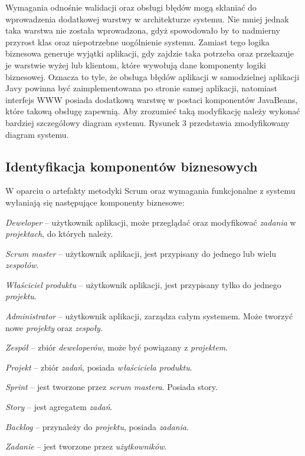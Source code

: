 Wymagania odnośnie walidacji oraz obsługi błędów mogą skłaniać do wprowadzenia dodatkowej warstwy w architekturze systemu. Nie mniej jednak taka warstwa nie została wprowadzona, gdyż spowodowało by to nadmierny przyrost klas oraz niepotrzebne uogólnienie systemu. Zamiast tego logika biznesowa generuje wyjątki aplikacji, gdy zajdzie taka potrzeba oraz przekazuje je warstwie wyżej lub klientom, które wywołują dane komponenty logiki biznesowej. Oznacza to tyle, że obsługa błędów aplikacji w samodzielnej aplikacji Javy powinna być zaimplementowana po stronie samej aplikacji, natomiast interfejs WWW posiada dodatkową warstwę w postaci komponentów JavaBeans, które takową obsługę zapewnią. Aby zrozumieć taką modyfikację należy wykonać bardziej szczegółowy diagram systemu. Rysunek 3 przedstawia zmodyfikowany diagram systemu.

\subsection{Identyfikacja komponentów biznesowych}
W oparciu o artefakty metodyki Scrum oraz wymagania funkcjonalne z systemu wyłaniają się następujące komponenty biznesowe:

\textit{Deweloper} -- użytkownik aplikacji, może przeglądać oraz modyfikować \textit{zadania} w \textit{projektach}, do których należy.

\textit{Scrum master} -- użytkownik aplikacji, jest przypisany do jednego lub wielu \textit{zespołów}.

\textit{Właściciel produktu} -- użytkownik aplikacji, jest przypisany tylko do jednego \textit{projektu}.

\textit{Administrator} -- użytkownik aplikacji, zarządza całym systemem. Może tworzyć nowe \textit{projekty} oraz \textit{zespoły}.

\textit{Zespół} -- zbiór \textit{deweloperów}, może być powiązany z \textit{projektem}.

\textit{Projekt} -- zbiór \textit{zadań}, posiada \textit{właściciela produktu}.

\textit{Sprint} -- jest tworzone przez  \textit{scrum mastera}. Posiada story.

\textit{Story} -- jest agregatem \textit{zadań}.

\textit{Backlog} -- przynależy do \textit{projektu}, posiada \textit{zadania}.

\textit{Zadanie} -- jest tworzone przez \textit{użytkowników}.


